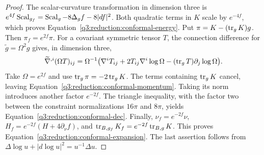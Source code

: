 \begin{proof}
The scalar-curvature transformation in dimension three is
$e^{4f}\operatorname{Scal}_{g_f}=\operatorname{Scal}_g-8\Delta_g f-8|df|^2$.
Both quadratic terms in $K$ scale by $e^{-4f}$, which proves
Equation~\eqref{q3:reduction:conformal-energy}.
Put $\pi=K-(\operatorname{tr}_gK)g$.  Then
$\pi_f=e^{2f}\pi$.  For a covariant symmetric tensor $T$, the connection
difference for $\widetilde g=\Omega^2g$ gives, in dimension three,
\[
 \widetilde\nabla^{,i}(\Omega T)_{ij}
 =\Omega^{-1}\bigl(\nabla^iT_{ij}
          +2T_{ij}\nabla^i\log\Omega
          -(\operatorname{tr}_gT)\partial_j\log\Omega\bigr).
\]
Take $\Omega=e^{2f}$ and use $\operatorname{tr}_g\pi=-2\operatorname{tr}_gK$.
The terms containing $\operatorname{tr}_gK$ cancel, leaving
Equation~\eqref{q3:reduction:conformal-momentum}.  Taking its norm introduces
another factor $e^{-2f}$.  The triangle inequality, with the factor two
between the constraint normalizations $16\pi$ and $8\pi$, yields
Equation~\eqref{q3:reduction:conformal-dec}.
Finally, $\nu_f=e^{-2f}\nu$,
$H_f=e^{-2f}(H+4\partial_\nu f)$, and
$\operatorname{tr}_{B,g_f}K_f=e^{-2f}\operatorname{tr}_{B,g}K$.  This proves
Equation~\eqref{q3:reduction:conformal-expansion}.  The last assertion follows
from $\Delta\log u+|d\log u|^2=u^{-1}\Delta u$.
\end{proof}

